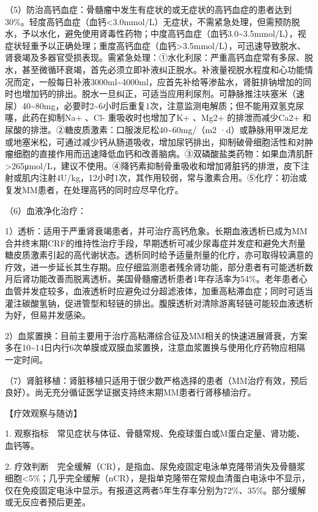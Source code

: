 （5）防治高钙血症：骨髓瘤中发生有症状的或无症状的高钙血症的患者达到30\%。轻度高钙血症（血钙\textless{}3.0mmol/L）无症状，不需紧急处理，但需预防脱水，予以水化，避免使用肾毒性药物；中度高钙血症（血钙3.0\textasciitilde{}3.5mmol/L），视症状轻重予以正确处理；重度高钙血症（血钙\textgreater{}3.5mmol/L），可迅速导致脱水、肾衰竭及多器官受损表现。需紧急处理：①水化利尿：严重高钙血症常有多尿、脱水，甚至微循环衰竭，首先必须立即补液纠正脱水。补液量视脱水程度和心功能情况而定，一般每日补液3000ml\textasciitilde{}4000ml，应首先补给等渗盐水，肾脏排钠增加的同时也增加钙的排出。脱水一旦纠正，可适当应用利尿剂。可静脉推注呋塞米（速尿）40\textasciitilde{}80mg，必要时2\textasciitilde{}6小时后重复1次，注意监测电解质；但不能用双氢克尿噻，此药在抑制Na{+}
、Cl{-} 重吸收时也增加了K{+} 、Mg{2+} 的排泄而减少Ca{2+}
和尿酸的排泄。②糖皮质激素：口服泼尼松40\textasciitilde{}60mg/（m{2}
·d）或静脉用甲泼尼龙或地塞米松，可通过减少钙从肠道吸收，增加尿钙排出，抑制破骨细胞活性和对肿瘤细胞的直接作用而迅速降低血钙和改善脑病。③双磷酸盐类药物：如果血清肌酐\textgreater{}265μmol/L，建议不使用。④降钙素抑制骨重吸收和增加肾脏钙的排泄，皮下注射或肌内注射4U/kg，12小时1次，其作用较弱，常与激素合用。⑤化疗：初治或复发MM患者，在处理高钙的同时应尽早化疗。

（6）血液净化治疗：

1）透析：适用于严重肾衰竭患者，并可治疗高钙危象。长期血液透析已成为MM合并终末期CRF的维持性治疗手段，早期透析可减少尿毒症并发症和避免大剂量糖皮质激素引起的高代谢状态。透析同时给予适量剂量的化疗，亦可取得较满意的疗效，进一步延长其生存期。应仔细监测患者残余肾功能，部分患者有可能透析数月后肾功能改善而脱离透析。美国骨髓瘤透析患者1年存活率为54\%。老年患者心血管并发症较多，血液透析时应避免过分超滤液体，加重高粘滞血症；同时可适当灌注碳酸氢钠，促进管型和轻链的排出。腹膜透析对清除游离轻链可能较血液透析为好，但易并发感染。

2）血浆置换：目前主要用于治疗高粘滞综合征及MM相关的快速进展肾衰，方案多在10\textasciitilde{}14日内行6次单膜或双膜血浆置换，注意血浆置换与使用化疗药物应相隔一定时间。

（7）肾脏移植：肾脏移植只适用于很少数严格选择的患者（MM治疗有效，预后良好）。尚无充分循证医学证据支持终末期MM患者行肾移植治疗。

【疗效观察与随访】

1.
观察指标　常见症状与体征、骨髓常规、免疫球蛋白或M蛋白定量、肾功能、血钙等。

2.
疗效判断　完全缓解（CR），是指血、尿免疫固定电泳单克隆带消失及骨髓浆细胞\textless{}5\%；几乎完全缓解（nCR），是指单克隆带在常规血清蛋白电泳中不显示，仅在免疫固定电泳中显示。有报道这两者5年生存率分别为72\%、35\%。部分缓解或无反应者预后更差。

